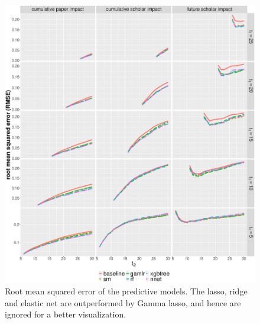 \begin{refsection}
\begin{figure}[ht!]
    \centering
    \includegraphics[width=\textwidth]{figures/pred_model/rmse.eps}
    \caption[RMSE of the predictive models]{Root mean squared error of the predictive models. The lasso, ridge and elastic net are outperformed by Gamma lasso, and hence are ignored for a better visualization.}
    \label{fig:pred_rmse}
\end{figure}


\end{refsection}
